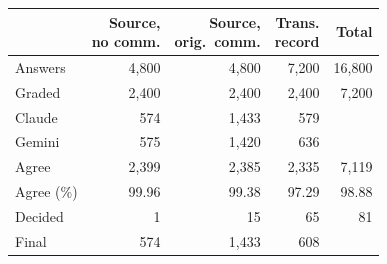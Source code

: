 \begin{tabular}{lrrrr}
\toprule
 & \shortstack[r]{Source,\\no comm.} & \shortstack[r]{Source,\\orig.\ comm.} & \shortstack[r]{Trans.\\record} & Total \\
\midrule
Answers & 4,800 & 4,800 & 7,200 & 16,800 \\
Graded & 2,400 & 2,400 & 2,400 & 7,200 \\
Claude & 574 & 1,433 & 579 &  \\
Gemini & 575 & 1,420 & 636 &  \\
Agree & 2,399 & 2,385 & 2,335 & 7,119 \\
Agree (\%) & 99.96 & 99.38 & 97.29 & 98.88 \\
Decided & 1 & 15 & 65 & 81 \\
Final & 574 & 1,433 & 608 &  \\
\bottomrule
\end{tabular}
